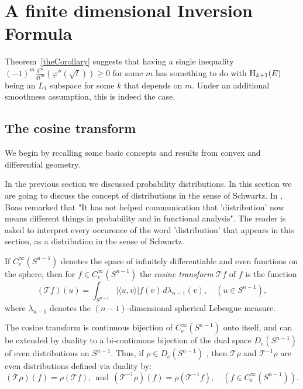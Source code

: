 \documentclass{article}[1100]
\theoremstyle{definition}
\theoremstyle{remark}
\newcommand\innerproduct[2]{\langle #1,#2\rangle}
\newcommand\testFunctionSpace{C_e^\infty(\sphere{n-1})}
\newcommand\mySpace[2]{\textsc{H}_{#1}(#2)}
\newcommand\sphere[1]{S^{#1}}
\newcommand{\CT}{\mathcal T}
\newcommand{\inverseCT}{{\mathcal T}^{-1}}
\begin{document}
\section{A finite dimensional Inversion Formula}

Theorem~\ref{theCorollary} suggests that having a single inequality $(-1)^m\frac{d^m}{dt^m}(\varphi''(\sqrt{t}))\geq 0$ for some $m$ has something to do with $\mySpace{k+1}{E}$ being an $L_1$ subspace for some $k$ that depends on $m$. Under an additional smoothness assumption, this is indeed the case.

\medskip

\subsection{The cosine transform}
We begin by recalling some basic concepts and results from  convex and differential geometry.

\medskip

 In the previous section we
discussed probability distributions. In this section we are going to discuss the concept of distributions in the sense of Schwartz. In \cite{Boas}, Boas remarked that
"It has not helped communication that 'distribution' now means different things in probability and in functional analysis". The reader
is asked to interpret every occurence of the word 'distribution' that appears in this section, as a distribution in the sense of Schwartz.
\medskip

 If $\testFunctionSpace$ denotes the space of infinitely differentiable and even functions on the
sphere, then for $f\in\testFunctionSpace$ the \emph{cosine transform} $\CT f$ of $f$ is the function
\begin{equation}\label{cosineTransformDefinition}
({\mathcal T}f)(u)=\int_{\sphere{n-1}}|\innerproduct{u}{v}|f(v)\,d\lambda_{n-1}(v), \quad (u\in\sphere{n-1}),
\end{equation}
where $\lambda_{n-1}$ denotes the $(n-1)$-dimensional spherical Lebesgue measure.

\medskip

The cosine transform is continuous bijection of $C_e^{\infty}(\sphere{n-1})$ onto itself, 
and can be extended by duality to a bi-continuous bijection of the dual space $D_e(\sphere{n-1})$ of even distributions on $\sphere{n-1}$.
Thus, if $\rho\in D_e(\sphere{n-1})$ , then $\CT\rho$ and $\inverseCT\rho$ are even distributions defined via duality by:
\[ (\CT\rho)(f)=\rho(\CT f),\ \ \mbox{and}\ \ (\inverseCT\rho)(f)=\rho(\inverseCT f),\quad (f\in\testFunctionSpace). \]
\end{document}
